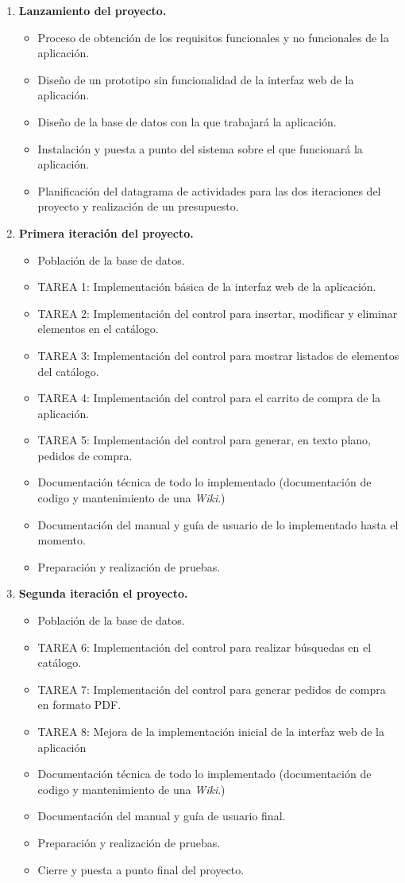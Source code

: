 \begin{enumerate}
	\item \textbf{Lanzamiento del proyecto.}
		\begin{itemize}
		\item Proceso de obtención de los requisitos funcionales y no funcionales de la aplicación.
		\item Diseño de un prototipo sin funcionalidad de la interfaz web de la aplicación.
		\item Diseño de la base de datos con la que trabajará la aplicación.
		\item Instalación  y puesta a punto del sistema sobre el que funcionará la aplicación.
		\item Planificación del datagrama de actividades para las dos iteraciones del proyecto y realización de un presupuesto.
		\end{itemize}
	\item \textbf{Primera iteración del proyecto.}
		\begin{itemize}
		\item Población de la base de datos.
		\item TAREA 1: Implementación básica de la interfaz web de la aplicación.
		\item TAREA 2: Implementación del control para insertar, modificar y eliminar elementos en el catálogo.
		\item TAREA 3: Implementación del control para mostrar listados de elementos del catálogo.
		\item TAREA 4: Implementación del control para el carrito de compra de la aplicación.
		\item TAREA 5: Implementación del control para generar, en texto plano, pedidos de compra.
		\item Documentación técnica de todo lo implementado (documentación de codigo y mantenimiento de una \textit{Wiki}.)
		\item Documentación del manual y guía de usuario de lo implementado hasta el momento.
		\item Preparación y realización de pruebas.
		\end{itemize}
	\item \textbf{Segunda iteración el proyecto.}
		\begin{itemize}
		\item Población de la base de datos.
		\item TAREA 6: Implementación del control para realizar búsquedas en el catálogo.
		\item TAREA 7: Implementación del control para generar pedidos de compra en formato PDF.
		\item TAREA 8: Mejora de la implementación inicial de la interfaz web de la aplicación
		\item Documentación técnica de todo lo implementado (documentación de codigo y mantenimiento de una \textit{Wiki}.)
		\item Documentación del manual y guía de usuario final.
		\item Preparación y realización de pruebas.
		\item Cierre y puesta a punto final del proyecto.
		\end{itemize}
\end{enumerate}
